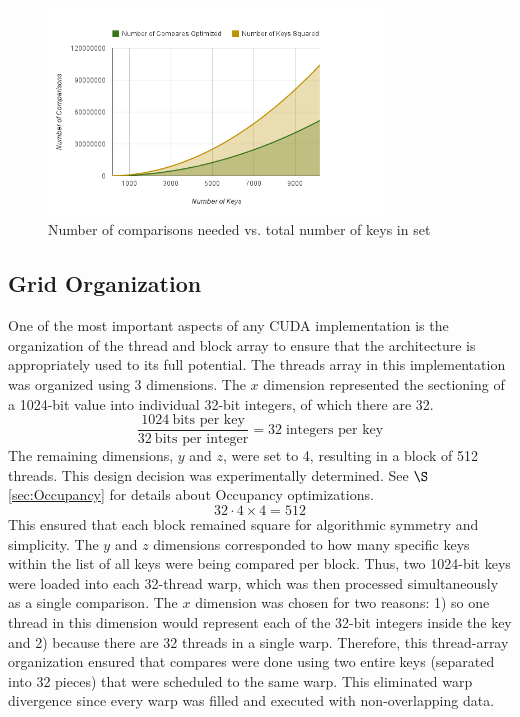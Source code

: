 \documentclass[12pt]{ucthesis}
\begin{document}
\begin{figure}
   \label{fig:compvkeys}
   \centering
   \includegraphics[width=3.5in]{chart_6.png}
   \caption{Number of comparisons needed vs. total number of keys in set}
\end{figure}

\subsection{Grid Organization}
\label{sec:gridorg}
One of the most important aspects of any CUDA implementation is the 
organization of the thread and block array to ensure that the architecture is 
appropriately used to its full potential. The threads array in this 
implementation was organized using 3 dimensions. The $x$ dimension represented 
the sectioning of a 1024-bit value into individual 32-bit integers, of which 
there are 32. 
\begin{displaymath}
   \frac{1024 \:\mbox{bits per key}}{32 \:\mbox{bits per integer}} = 
   32 \;\mbox{integers per key}
\end{displaymath}
The remaining dimensions, $y$ and $z$, were set to 4, resulting in a block of 
512 threads. This design decision was experimentally determined. See 
$\S$\ref{sec:Occupancy} for details about Occupancy optimizations.
\begin{displaymath}
   32 \cdot 4 \times 4 = 512
\end{displaymath}
This ensured that each block remained square for algorithmic 
symmetry and simplicity. The $y$ and $z$ dimensions corresponded to how many 
specific keys within the list of all keys were being compared per block. 
Thus, two 1024-bit keys were loaded into each 32-thread warp, which was 
then processed simultaneously as a single comparison. The $x$ dimension was 
chosen for two reasons: 1) so one thread in this dimension would represent 
each of the 32-bit integers inside the key and 2) because there are 32 threads 
in a single warp. Therefore, this thread-array organization ensured that 
compares were done using two entire keys (separated into 32 pieces) that were 
scheduled to the same warp. This eliminated warp divergence since every warp 
was filled and executed with non-overlapping data.
\end{document}
